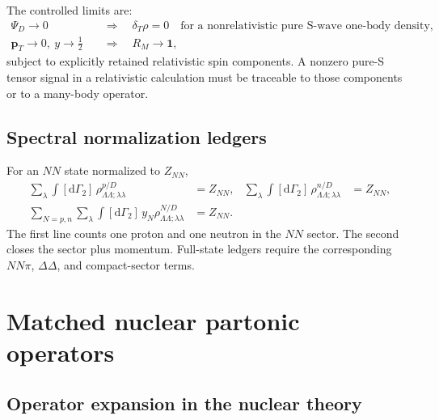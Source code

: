 \documentclass[11pt]{article}
\newcommand{\pT}{\bm{p}_{T}}
\newcommand{\dd}{\mathrm{d}}
\newcommand{\bbone}{\bm 1}
\newcommand{\NN}{NN}
\begin{document}
The controlled limits are:
\begin{align}
 \Psi_D\to0
 &\quad\Longrightarrow\quad
 \delta_T\rho=0
 \quad\text{for a nonrelativistic pure S-wave one-body density},
\label{eq:pure-s-tensor-zero}\\
 \pT\to0,\ y\to\tfrac12
 &\quad\Longrightarrow\quad
 R_M\to\bbone,
\label{eq:melosh-nonrel-limit}
\end{align}
subject to explicitly retained relativistic spin components.  A nonzero
pure-S tensor signal in a relativistic calculation must be traceable to those
components or to a many-body operator.

\subsection{Spectral normalization ledgers}

For an \(NN\) state normalized to \(Z_{\NN}\),
\begin{align}
 \sum_\lambda\int[\dd\Gamma_2]\,
 \rho_{\Lambda\Lambda;\lambda\lambda}^{p/D}
 &=Z_{\NN},
 &
 \sum_\lambda\int[\dd\Gamma_2]\,
 \rho_{\Lambda\Lambda;\lambda\lambda}^{n/D}
 &=Z_{\NN},
\label{eq:nucleon-number-spectral-ledger}\\
 \sum_{N=p,n}\sum_\lambda
 \int[\dd\Gamma_2]\,y_N
 \rho_{\Lambda\Lambda;\lambda\lambda}^{N/D}
 &=Z_{\NN}.
\label{eq:nucleon-momentum-spectral-ledger}
\end{align}
The first line counts one proton and one neutron in the \(NN\) sector.  The
second closes the sector plus momentum.  Full-state ledgers require the
corresponding \(NN\pi\), \(\Delta\Delta\), and compact-sector terms.

\section{Matched nuclear partonic operators}
\label{sec:nuclear-operators}

\subsection{Operator expansion in the nuclear theory}
\end{document}
